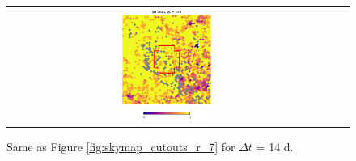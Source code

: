 \documentclass[preprintm,linenumbers]{aastex631}
\begin{document}
\begin{figure}
\begin{tabular}{  c c c}
				\includegraphics[width=0.3\textwidth]{results/skymaps_cutout/skymaps_cutout_delta_first_year_one_snap_v4_0_10yrs_db_noDD_noTwi_tscale-14_nside-256_doAllTemplateMetrics_reduceCount_r_GP_noDD_noTwi.pdf} \\
			\end{tabular}
			\caption{
				 Same as Figure \ref{fig:skymap_cutouts_r_7} for $\Delta t$ = 14 d.  
			}
   \label{fig:skymap_cutouts_r_14}
		\end{figure}
\end{document}
